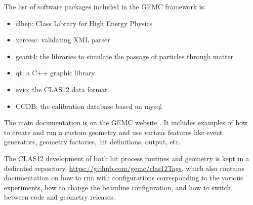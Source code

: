 The list of software packages included in the GEMC framework is:

\begin{itemize}
	\item clhep: Class Library for High Energy Physics \cite{clhep}
	\item xercesc: validating XML parser \cite{xercesc}
	\item geant4: the libraries to simulate the passage of particles through matter \cite{geant4}
	\item qt: a C++ graphic library \cite{qt}
	\item evio: the CLAS12 data format \cite{evio}
	\item CCDB: the calibration database based on mysql \cite{ccdb}
\end{itemize}

The main documentation is on the GEMC website \cite{GEMC}. It includes examples of how to create and run a custom geometry
and use various features like event generators, geometry factories, hit definitions, output, etc.

The CLAS12 development of both hit process routines and geometry is kept in a dedicated repository, \url{https://github.com/gemc/clas12Tags},
which also contains documentation on how to run with configurations corresponding to the various experiments, how to change the
beamline configuration, and how to switch between code and geometry releases.





